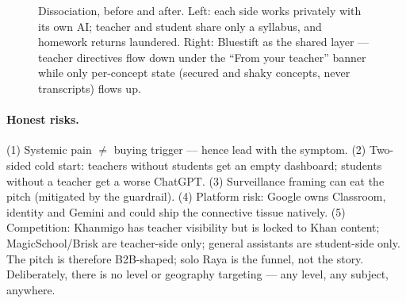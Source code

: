 \documentclass[11pt,a4paper]{article}
\begin{document}
\begin{figure}[h]
\centering
{}
\caption{Dissociation, before and after. Left: each side works privately with
its own AI; teacher and student share only a syllabus, and homework returns
laundered. Right: Bluestift as the shared layer --- teacher directives flow
down under the ``From your teacher'' banner while only per-concept state
(secured and shaky concepts, never transcripts) flows up.}
\label{fig:dissociation}
\end{figure}

\paragraph{Honest risks.} (1) Systemic pain $\neq$ buying trigger --- hence
lead with the symptom. (2) Two-sided cold start: teachers without students get
an empty dashboard; students without a teacher get a worse ChatGPT. (3)
Surveillance framing can eat the pitch (mitigated by the guardrail). (4)
Platform risk: Google owns Classroom, identity and Gemini and could ship the
connective tissue natively. (5) Competition: Khanmigo has teacher visibility
but is locked to Khan content; MagicSchool/Brisk are teacher-side only;
general assistants are student-side only. The pitch is therefore B2B-shaped;
solo Raya is the funnel, not the story. Deliberately, there is no level or
geography targeting --- any level, any subject, anywhere.
\end{document}
